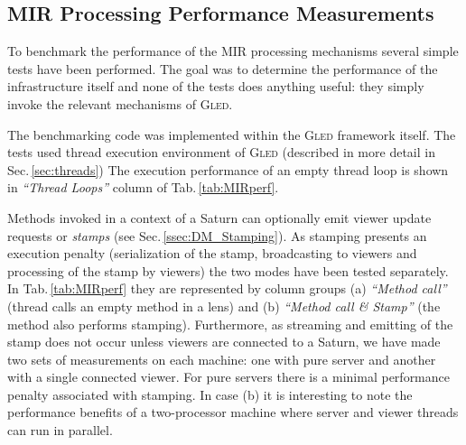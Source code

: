 \documentclass[final]{siamltex}
\def\gled{\textsc{Gled}\xspace}
\begin{document}
\subsection{MIR Processing Performance Measurements}
\label{ssec:DM_perf}

To benchmark the performance of the MIR processing mechanisms several
simple tests have been performed. The goal was to determine the
performance of the infrastructure itself and none of the tests does
anything useful: they simply invoke the relevant mechanisms of \gled.

The benchmarking code was implemented within the \gled framework
itself. The tests used thread execution environment of \gled
(described in more detail in Sec.\,\ref{sec:threads}) The execution
performance of an empty thread loop is shown in \emph{``Thread Loops''}
column of Tab.\,\ref{tab:MIRperf}.

Methods invoked in a context of a Saturn can optionally emit viewer
update requests or \emph{stamps} (see Sec.\,\ref{ssec:DM_Stamping}). As
stamping presents an execution penalty (serialization of the stamp,
broadcasting to viewers and processing of the stamp by viewers) the
two modes have been tested separately. In Tab.\,\ref{tab:MIRperf} they
are represented by column groups (a) \emph{``Method call''} (thread
calls an empty method in a lens) and (b) \emph{``Method call \&
  Stamp''} (the method also performs stamping). Furthermore, as
streaming and emitting of the stamp does not occur unless viewers are
connected to a Saturn, we have made two sets of measurements on each
machine: one with pure server and another with a single connected
viewer. For pure servers there is a minimal performance penalty
associated with stamping. In case (b) it is interesting to note the
performance benefits of a two-processor machine where server and
viewer threads can run in parallel.
\end{document}
